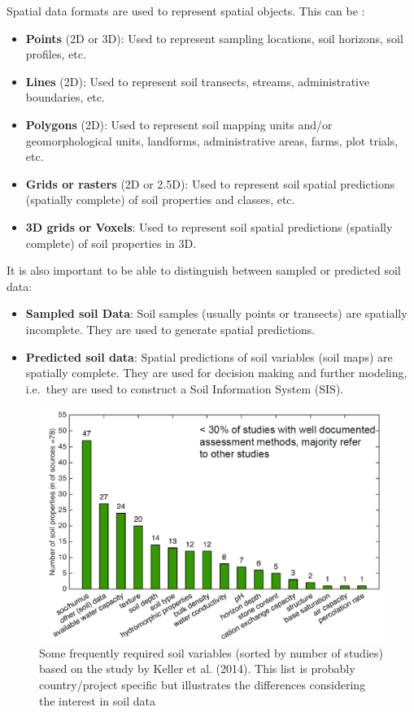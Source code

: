 \documentclass[10pt,b5paper,]{book}
\providecommand{\tightlist}{%
  \setlength{\itemsep}{0pt}\setlength{\parskip}{0pt}}
\theoremstyle{definition}
\theoremstyle{definition}
\theoremstyle{definition}
\theoremstyle{remark}
\begin{document}
Spatial data formats are used to represent spatial objects. This can be
\citep{bivand2013classes, neteler2013open}:

\begin{itemize}
\tightlist
\item
  \textbf{Points} (2D or 3D): Used to represent sampling locations, soil
  horizons, soil profiles, etc.
\item
  \textbf{Lines} (2D): Used to represent soil transects, streams,
  administrative boundaries, etc.
\item
  \textbf{Polygons} (2D): Used to represent soil mapping units and/or
  geomorphological units, landforms, administrative areas, farms, plot
  trials, etc.
\item
  \textbf{Grids or rasters} (2D or 2.5D): Used to represent soil spatial
  predictions (spatially complete) of soil properties and classes, etc.
\item
  \textbf{3D grids or Voxels}: Used to represent soil spatial
  predictions (spatially complete) of soil properties in 3D.
\end{itemize}

It is also important to be able to distinguish between sampled or
predicted soil data:

\begin{itemize}
\tightlist
\item
  \textbf{Sampled soil Data}: Soil samples (usually points or transects)
  are spatially incomplete. They are used to generate spatial
  predictions.
\item
  \textbf{Predicted soil data}: Spatial predictions of soil variables
  (soil maps) are spatially complete. They are used for decision making
  and further modeling, i.e.~they are used to construct a Soil
  Information System (SIS).
\end{itemize}

\begin{figure}
\centering
\includegraphics{images/Data_sharing_soil_variables.png}
\caption{Some frequently required soil variables (sorted by number of
studies) based on the study by Keller et al. (2014). This list is
probably country/project specific but illustrates the differences
considering the interest in soil data}
\end{figure}
\end{document}
